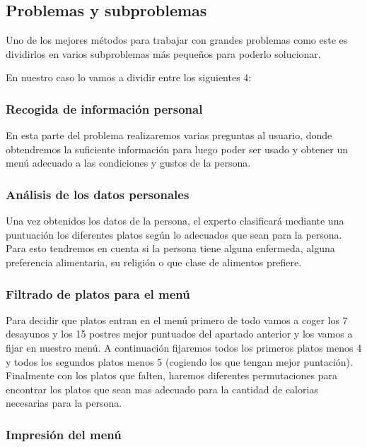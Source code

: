 \documentclass[12]{article}
\begin{document}
\subsection{Problemas y subproblemas}

Uno de los mejores métodos para trabajar con grandes problemas como este es dividirlos en varios subproblemas más pequeños para poderlo solucionar.

En nuestro caso lo vamos a dividir entre los siguientes 4:

\subsubsection{Recogida de información personal}

En esta parte del problema realizaremos varias preguntas al usuario, donde obtendremos la suficiente información para luego poder ser usado y obtener un menú adecuado a las condiciones y gustos de la persona.

\subsubsection{Análisis de los datos personales}

Una vez obtenidos los datos de la persona, el experto clasificará mediante una puntuación los diferentes platos según lo adecuados que sean para la persona. Para esto tendremos en cuenta si la persona tiene alguna enfermeda, alguna preferencia alimentaria, su religión o que clase de alimentos prefiere.

\subsubsection{Filtrado de platos para el menú}

Para decidir que platos entran en el menú primero de todo vamos a coger los 7 desayunos y los 15 postres mejor puntuados del apartado anterior y los vamos a fijar en nuestro menú. A continuación fijaremos todos los primeros platos menos 4 y todos los segundos platos menos 5 (cogiendo los que tengan mejor puntación).
Finalmente con los platos que falten, haremos diferentes permutaciones para encontrar los platos que sean mas adecuado para la cantidad de calorias necesarias para la persona.

\subsubsection{Impresión del menú}
\end{document}
